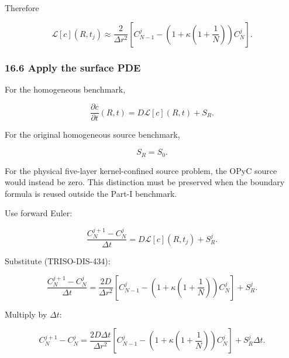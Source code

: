\documentclass[11pt,a4paper]{article}
\begin{document}
Therefore

\begin{equation}
\boxed{
\mathcal L[c](R,t_j)
\approx
\frac2{\Delta r^2}
\left[
C_{N-1}^j
-
\left(
1+\kappa\left(1+\frac1N\right)
\right)
C_N^j
\right].
}
\tag{TRISO-DIS-434}
\label{eq:triso-dis-434}
\end{equation}

\subsubsection*{16.6 Apply the surface PDE}

For the homogeneous benchmark,

\begin{equation}
\frac{\partial c}{\partial t}(R,t)
=
D\mathcal L[c](R,t)
+
S_R.
\tag{TRISO-DIS-435}
\label{eq:triso-dis-435}
\end{equation}

For the original homogeneous source benchmark,

\begin{equation}
S_R=S_0.
\tag{TRISO-DIS-436}
\label{eq:triso-dis-436}
\end{equation}

For the physical five-layer kernel-confined source problem, the OPyC source would instead be zero. This distinction must be preserved when the boundary formula is reused outside the Part-I benchmark.

Use forward Euler:

\begin{equation}
\frac{
C_N^{j+1}-C_N^j
}{
\Delta t
}
=
D\mathcal L[c](R,t_j)
+
S_R^j.
\tag{TRISO-DIS-437}
\label{eq:triso-dis-437}
\end{equation}

Substitute (TRISO-DIS-434):

\begin{equation}
\frac{
C_N^{j+1}-C_N^j
}{
\Delta t
}
=
\frac{2D}{\Delta r^2}
\left[
C_{N-1}^j
-
\left(
1+\kappa\left(1+\frac1N\right)
\right)
C_N^j
\right]
+
S_R^j.
\tag{TRISO-DIS-438}
\label{eq:triso-dis-438}
\end{equation}

Multiply by $\Delta t$:

\begin{equation}
C_N^{j+1}-C_N^j
=
\frac{2D\Delta t}{\Delta r^2}
\left[
C_{N-1}^j
-
\left(
1+\kappa\left(1+\frac1N\right)
\right)
C_N^j
\right]
+
S_R^j\Delta t.
\tag{TRISO-DIS-439}
\label{eq:triso-dis-439}
\end{equation}
\end{document}
